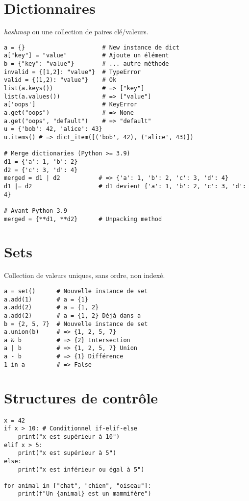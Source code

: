\documentclass{article}
\begin{document}
\begin{multicols*}{4}
\section*{Dictionnaires}
\emph{hashmap} ou une collection de paires clé/valeurs.
\begin{lstlisting}
a = {}                      # New instance de dict
a["key"] = "value"          # Ajoute un élément
b = {"key": "value"}        # ... autre méthode
invalid = {[1,2]: "value"}  # TypeError
valid = {(1,2): "value"}    # Ok
list(a.keys())              # => ["key"]
list(a.values())            # => ["value"]
a['oops']                   # KeyError
a.get("oops")               # => None
a.get("oops", "default")    # => "default"
u = {'bob': 42, 'alice': 43}
u.items() # => dict_item([('bob', 42), ('alice', 43)])

# Merge dictionaries (Python >= 3.9)
d1 = {'a': 1, 'b': 2}
d2 = {'c': 3, 'd': 4}
merged = d1 | d2           # => {'a': 1, 'b': 2, 'c': 3, 'd': 4}
d1 |= d2                   # d1 devient {'a': 1, 'b': 2, 'c': 3, 'd': 4}

# Avant Python 3.9
merged = {**d1, **d2}      # Unpacking method
\end{lstlisting}

\section*{Sets}
Collection de valeurs uniques, sans ordre, non indexé.
\begin{lstlisting}
a = set()      # Nouvelle instance de set
a.add(1)       # a = {1}
a.add(2)       # a = {1, 2}
a.add(2)       # a = {1, 2} Déjà dans a
b = {2, 5, 7}  # Nouvelle instance de set
a.union(b)     # => {1, 2, 5, 7}
a & b          # => {2} Intersection
a | b          # => {1, 2, 5, 7} Union
a - b          # => {1} Différence
1 in a         # => False
\end{lstlisting}

\section*{Structures de contrôle}
\begin{lstlisting}
x = 42
if x > 10: # Conditionnel if-elif-else
    print("x est supérieur à 10")
elif x > 5:
    print("x est supérieur à 5")
else:
    print("x est inférieur ou égal à 5")

for animal in ["chat", "chien", "oiseau"]:
    print(f"Un {animal} est un mammifère")


\end{lstlisting}
\end{multicols*}
\end{document}
